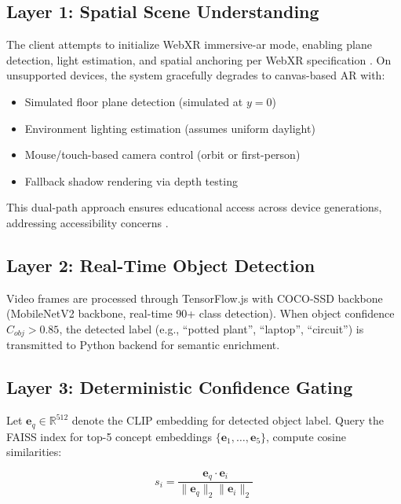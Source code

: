 \documentclass[conference]{IEEEtran}
\begin{document}
\subsection{Layer 1: Spatial Scene Understanding}

The client attempts to initialize WebXR immersive-ar mode, enabling plane detection, light estimation, and spatial anchoring per WebXR specification \cite{robinson2025webxr}. On unsupported devices, the system gracefully degrades to canvas-based AR with:

\begin{itemize}
    \item Simulated floor plane detection (simulated at $y=0$)
    \item Environment lighting estimation (assumes uniform daylight)
    \item Mouse/touch-based camera control (orbit or first-person)
    \item Fallback shadow rendering via depth testing
\end{itemize}

This dual-path approach ensures educational access across device generations, addressing accessibility concerns \cite{brown2023ar}.

\subsection{Layer 2: Real-Time Object Detection}

Video frames are processed through TensorFlow.js with COCO-SSD backbone (MobileNetV2 backbone, real-time 90+ class detection). When object confidence $C_{obj} > 0.85$, the detected label (e.g., ``potted plant'', ``laptop'', ``circuit'') is transmitted to Python backend for semantic enrichment.

\subsection{Layer 3: Deterministic Confidence Gating}

Let $\mathbf{e}_q \in \mathbb{R}^{512}$ denote the CLIP embedding for detected object label. Query the FAISS index for top-5 concept embeddings $\{\mathbf{e}_1, \ldots, \mathbf{e}_5\}$, compute cosine similarities:

\begin{equation}
s_i = \frac{\mathbf{e}_q \cdot \mathbf{e}_i}{\|\mathbf{e}_q\|_2 \|\mathbf{e}_i\|_2}
\end{equation}
\end{document}
